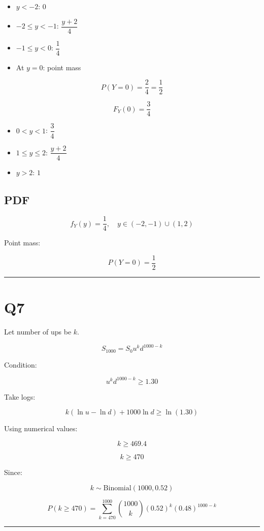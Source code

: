 \documentclass[12pt]{article}
\begin{document}
\begin{itemize}
\item $y < -2$: \quad $0$
\item $-2 \le y < -1$: \quad $\dfrac{y+2}{4}$
\item $-1 \le y < 0$: \quad $\dfrac{1}{4}$
\item At $y=0$: point mass
\end{itemize}

\[
P(Y=0)=\frac{2}{4}=\frac{1}{2}
\]

\[
F_Y(0)=\frac{3}{4}
\]

\begin{itemize}
\item $0<y<1$: \quad $\dfrac{3}{4}$
\item $1\le y\le2$: \quad $\dfrac{y+2}{4}$
\item $y>2$: \quad $1$
\end{itemize}

\subsection*{PDF}

\[
f_Y(y)=\frac{1}{4}, \quad y\in(-2,-1)\cup(1,2)
\]

Point mass:

\[
P(Y=0)=\frac{1}{2}
\]

\hrule
\vspace{0.5cm}

\section*{Q7}

Let number of ups be $k$.

\[
S_{1000}=S_0 u^k d^{1000-k}
\]

Condition:

\[
u^k d^{1000-k} \ge 1.30
\]

Take logs:

\[
k(\ln u - \ln d) + 1000\ln d \ge \ln(1.30)
\]

Using numerical values:

\[
k \ge 469.4
\]

\[
k \ge 470
\]

Since:

\[
k \sim \text{Binomial}(1000,0.52)
\]

\[
P(k\ge470)
=
\sum_{k=470}^{1000}
\binom{1000}{k}
(0.52)^k
(0.48)^{1000-k}
\]

\hrule
\vspace{0.5cm}
\end{document}
